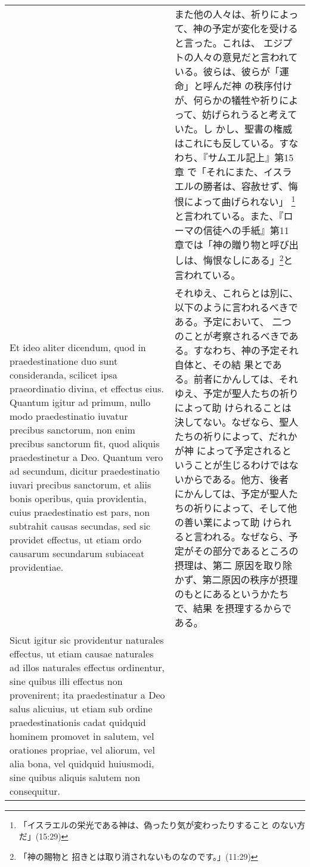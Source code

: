 \documentclass[10pt]{jsarticle} %
\begin{document}
\begin{longtable}{p{21em}p{21em}}
&

また他の人々は、祈りによって、神の予定が変化を受けると言った。これは、
 エジプトの人々の意見だと言われている。彼らは、彼らが「運命」と呼んだ神
 の秩序付けが、何らかの犠牲や祈りによって、妨げられうると考えていた。し
 かし、聖書の権威はこれにも反している。すなわち、『サムエル記上』第15章
 で「それにまた、イスラエルの勝者は、容赦せず、悔恨によって曲げられない」
 \footnote{「イスラエルの栄光である神は、偽ったり気が変わったりすること
 のない方だ」(15:29)}と言われている。また、『ローマの信徒への手紙』第11
 章では「神の贈り物と呼び出しは、悔恨なしにある」\footnote{「神の賜物と
 招きとは取り消されないものなのです。」(11:29)}と言われている。


\\


Et ideo
aliter dicendum, quod in praedestinatione duo sunt consideranda,
scilicet ipsa praeordinatio divina, et effectus eius. Quantum igitur ad
primum, nullo modo praedestinatio iuvatur precibus sanctorum, non enim
precibus sanctorum fit, quod aliquis praedestinetur a Deo. Quantum vero
ad secundum, dicitur praedestinatio iuvari precibus sanctorum, et aliis
bonis operibus, quia providentia, cuius praedestinatio est pars, non
subtrahit causas secundas, sed sic providet effectus, ut etiam ordo
causarum secundarum subiaceat providentiae. 


&

それゆえ、これらとは別に、以下のように言われるべきである。予定において、
 二つのことが考察されるべきである。すなわち、神の予定それ自体と、その結
 果とである。前者にかんしては、それゆえ、予定が聖人たちの祈りによって助
 けられることは決してない。なぜなら、聖人たちの祈りによって、だれかが神
 によって予定されるということが生じるわけではないからである。他方、後者
 にかんしては、予定が聖人たちの祈りによって、そして他の善い業によって助
 けられると言われる。なぜなら、予定がその部分であるところの摂理は、第二
 原因を取り除かず、第二原因の秩序が摂理のもとにあるというかたちで、結果
 を摂理するからである。


\\



Sicut igitur sic providentur
naturales effectus, ut etiam causae naturales ad illos naturales
effectus ordinentur, sine quibus illi effectus non provenirent; ita
praedestinatur a Deo salus alicuius, ut etiam sub ordine
praedestinationis cadat quidquid hominem promovet in salutem, vel
orationes propriae, vel aliorum, vel alia bona, vel quidquid huiusmodi,
sine quibus aliquis salutem non consequitur. 




\end{longtable}
\end{document}
